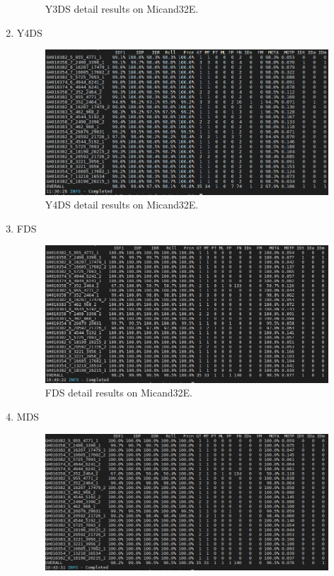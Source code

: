 \begin{enumerate}
\begin{figure}
			\caption{Y3DS detail results on Micand32E.}
		\end{figure}
	\item Y4DS
		\begin{figure}
			\centerline{\includegraphics[width=1\linewidth]{Figs/Evaluation/micand26/y4ds.png}}
			\caption{Y4DS detail results on Micand32E.}
		\end{figure}
	\item FDS
		\begin{figure}
			\centerline{\includegraphics[width=1\linewidth]{Figs/Evaluation/micand26/fds.png}}
			\caption{FDS detail results on Micand32E.}
		\end{figure}
	\item MDS
		\begin{figure}
			\centerline{\includegraphics[width=1\linewidth]{Figs/Evaluation/micand26/mds.png}}

\end{figure}
\end{enumerate}
